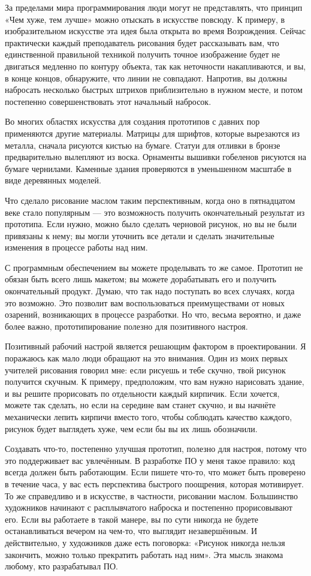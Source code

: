 \documentclass[ebook,12pt,oneside,openany]{memoir}
\begin{document}
За пределами мира программирования люди могут не представлять, что
принцип «Чем хуже, тем лучше» можно отыскать в искусстве повсюду. К
примеру, в изобразительном искусстве эта идея была открыта во время
Возрождения. Сейчас практически каждый преподаватель рисования будет
рассказывать вам, что единственной правильной техникой получить точное
изображение будет не двигаться медленно по контуру объекта, так как
неточности накапливаются, и вы, в конце концов, обнаружите, что линии
не совпадают. Напротив, вы должны набросать несколько быстрых штрихов
приблизительно в нужном месте, и потом постепенно совершенствовать
этот начальный набросок.

Во многих областях искусства для создания прототипов с давних пор
применяются другие материалы. Матрицы для шрифтов, которые вырезаются
из металла, сначала рисуются кистью на бумаге. Статуи для отливки в
бронзе предварительно вылепляют из воска. Орнаменты вышивки гобеленов
рисуются на бумаге чернилами. Каменные здания проверяются в
уменьшенном масштабе в виде деревянных моделей.

Что сделало рисование маслом таким перспективным, когда оно в
пятнадцатом веке стало популярным — это возможность получить
окончательный результат из прототипа. Если нужно, можно было сделать
черновой рисунок, но вы не были привязаны к нему; вы могли уточнить
все детали и сделать значительные изменения в процессе работы над ним.

С программным обеспечением вы можете проделывать то же самое. Прототип
не обязан быть всего лишь макетом; вы можете дорабатывать его и
получить окончательный продукт. Думаю, что так надо поступать во всех
случаях, когда это возможно. Это позволит вам воспользоваться
преимуществами от новых озарений, возникающих в процессе разработки.
Но что, весьма вероятно, и даже более важно, прототипирование полезно
для позитивного настроя.

Позитивный рабочий настрой является решающим фактором в
проектировании. Я поражаюсь как мало люди обращают на это внимания.
Один из моих первых учителей рисования говорил мне: если рисуешь и
тебе скучно, твой рисунок получится скучным. К примеру, предположим,
что вам нужно нарисовать здание, и вы решите прорисовать по
отдельности каждый кирпичик. Если хочется, можете так сделать, но если
на середине вам станет скучно, и вы начнёте механически лепить кирпичи
вместо того, чтобы соблюдать качество каждого, рисунок будет выглядеть
хуже, чем если бы вы их лишь обозначили.

Создавать что-то, постепенно улучшая прототип, полезно для настроя,
потому что это поддерживает вас увлечённым. В разработке ПО у меня
такое правило: код всегда должен быть работающим. Если пишете что-то,
что может быть проверено в течение часа, у вас есть перспектива
быстрого поощрения, которая мотивирует. То же справедливо и в
искусстве, в частности, рисовании маслом. Большинство художников
начинают с расплывчатого наброска и постепенно прорисовывают его. Если
вы работаете в такой манере, вы по сути никогда не будете
останавливаться вечером на чем-то, что выглядит незавершённым. И
действительно, у художников даже есть поговорка: «Рисунок никогда
нельзя закончить, можно только прекратить работать над ним». Эта мысль
знакома любому, кто разрабатывал ПО.
\end{document}
